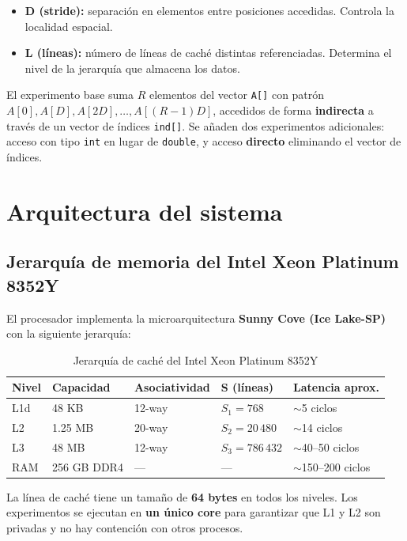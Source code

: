 \documentclass[12pt,a4paper]{article}
\begin{document}
\begin{itemize}[leftmargin=1.5em]
  \item \textbf{D (stride):} separación en elementos entre posiciones accedidas. Controla la localidad espacial.
  \item \textbf{L (líneas):} número de líneas de caché distintas referenciadas. Determina el nivel de la jerarquía que almacena los datos.
\end{itemize}

El experimento base suma $R$ elementos del vector \texttt{A[]} con patrón $A[0], A[D], A[2D], \ldots, A[(R{-}1)D]$, accedidos de forma \textbf{indirecta} a través de un vector de índices \texttt{ind[]}. Se añaden dos experimentos adicionales: acceso con tipo \texttt{int} en lugar de \texttt{double}, y acceso \textbf{directo} eliminando el vector de índices.

\section{Arquitectura del sistema}

\subsection{Jerarquía de memoria del Intel Xeon Platinum 8352Y}

El procesador implementa la microarquitectura \textbf{Sunny Cove (Ice Lake-SP)} con la siguiente jerarquía:

\begin{table}[H]
\centering
\caption{Jerarquía de caché del Intel Xeon Platinum 8352Y}
\label{tab:jerarquia}
\begin{tabular}{lllll}
\toprule
\textbf{Nivel} & \textbf{Capacidad} & \textbf{Asociatividad} & \textbf{S (líneas)} & \textbf{Latencia aprox.} \\
\midrule
L1d & 48 KB & 12-way & $S_1 = 768$ & $\sim$5 ciclos \\
L2  & 1.25 MB & 20-way & $S_2 = 20\,480$ & $\sim$14 ciclos \\
L3  & 48 MB & 12-way & $S_3 = 786\,432$ & $\sim$40--50 ciclos \\
RAM & 256 GB DDR4 & — & — & $\sim$150--200 ciclos \\
\bottomrule
\end{tabular}
\end{table}

La línea de caché tiene un tamaño de \textbf{64 bytes} en todos los niveles. Los experimentos se ejecutan en \textbf{un único core} para garantizar que L1 y L2 son privadas y no hay contención con otros procesos.
\end{document}
